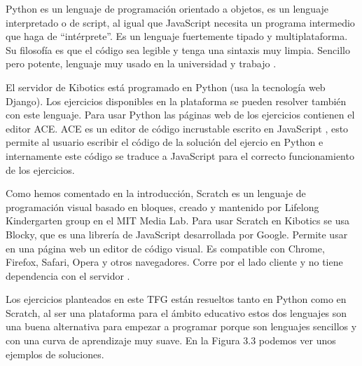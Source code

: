 Python es un lenguaje de programación orientado a objetos, es un lenguaje interpretado o de script, al igual que JavaScript necesita un programa intermedio que haga de ``intérprete''. Es un lenguaje fuertemente tipado y multiplataforma. Su filosofía es que el código sea legible y tenga  una sintaxis muy limpia. Sencillo pero potente, lenguaje muy usado en la universidad y trabajo \cite{python}.

El servidor de Kibotics está programado en Python (usa la tecnología web Django). Los ejercicios disponibles en la plataforma se pueden resolver también con este lenguaje. Para usar Python las páginas web de los ejercicios contienen el editor ACE. ACE es un editor de código incrustable escrito en JavaScript \cite{aceeditor}, esto permite al usuario escribir el código de la solución del ejercio en Python e internamente este código se traduce a JavaScript para el correcto funcionamiento de los ejercicios. 

Como hemos comentado en la introducción, Scratch es un lenguaje de programación visual basado en bloques, creado y mantenido por Lifelong Kindergarten group en el MIT Media Lab. Para usar Scratch en Kibotics se usa Blocky, que es una librería de JavaScript desarrollada por Google. Permite usar en una página web un editor de código visual. Es compatible con Chrome, Firefox, Safari, Opera y otros navegadores. Corre por el lado cliente y no tiene dependencia con el servidor \cite{blocky}.


Los ejercicios planteados en este TFG están resueltos tanto en Python como en Scratch, al ser una plataforma para el ámbito educativo estos dos lenguajes son una buena alternativa para empezar a programar porque son lenguajes sencillos y con una curva de aprendizaje muy suave. En la Figura 3.3 podemos ver unos ejemplos de soluciones.

